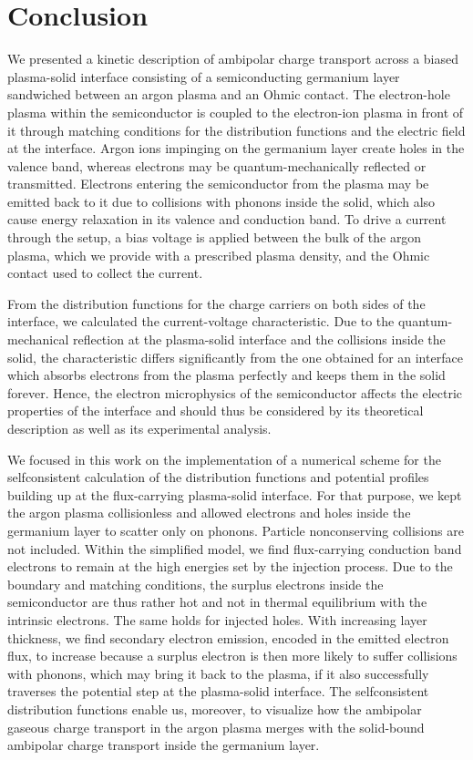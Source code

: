 \documentclass[pre,reprint,floats]{revtex4-1}
\begin{document}
\section{Conclusion}\label{sec:conclusion}

We presented a kinetic description of ambipolar charge transport across a biased plasma-solid 
interface consisting of a semiconducting germanium layer sandwiched between an argon plasma and an 
Ohmic contact. The electron-hole plasma within the semiconductor is coupled to the electron-ion plasma 
in front of it through matching conditions for the distribution functions and the electric field 
at the interface. Argon ions impinging on the germanium layer create holes in the valence band, whereas 
electrons may be quantum-mechanically reflected or transmitted. Electrons entering the 
semiconductor from the plasma may be emitted back to it due to collisions with phonons inside the 
solid, which also cause energy relaxation in its valence and conduction band. To drive a 
current through the setup, a bias voltage is applied between the bulk of the argon plasma, which we 
provide with a prescribed plasma density, and the Ohmic contact used to collect the current.  

From the distribution functions for the charge carriers on both sides of the interface, 
we calculated the current-voltage characteristic. Due to the quantum-mechanical reflection at the
plasma-solid interface and the collisions inside the solid, the characteristic differs significantly
from the one obtained for an interface which absorbs electrons from the plasma perfectly and keeps 
them in the solid forever. Hence, the electron microphysics of the semiconductor affects the electric
properties of the interface and should thus be considered by its theoretical description as well as 
its experimental analysis.

We focused in this work on the implementation of a numerical scheme for the selfconsistent 
calculation of the distribution functions and potential profiles building up at the flux-carrying
plasma-solid interface. For that purpose, we kept the argon plasma collisionless and allowed 
electrons and holes inside the germanium layer to scatter only on phonons. Particle 
nonconserving collisions are not included. Within the simplified model, we find flux-carrying 
conduction band electrons to remain at the high energies set by the injection process. Due to 
the boundary and matching conditions, the surplus electrons inside the semiconductor are thus 
rather hot and not in thermal equilibrium with the intrinsic electrons. The same holds for injected 
holes. With increasing layer thickness, we find secondary electron emission, encoded in the emitted 
electron flux, to increase because a surplus electron is then more likely to suffer collisions with 
phonons, which may bring it back to the plasma, if it also successfully traverses the potential step 
at the plasma-solid interface. The selfconsistent distribution functions enable us, moreover, to 
visualize how the ambipolar gaseous charge transport in the argon plasma merges with the solid-bound 
ambipolar charge transport inside the germanium layer. 
\end{document}
